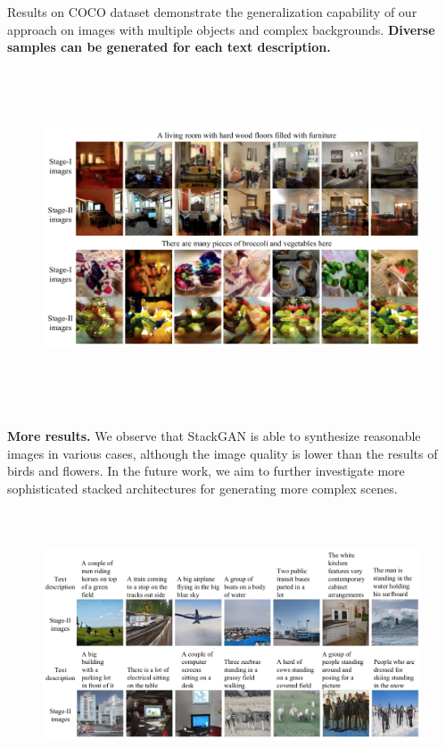 \documentclass[a4paper,12pt,oneside]{article}
\begin{document}
Results on COCO dataset demonstrate the generalization capability of our approach on images with multiple objects and complex backgrounds.
\textbf{Diverse samples can be generated for each text description.}
\begin{figure}[H]
  \centering
  \includegraphics[height=10cm,width=15cm]{Figure15.png}
  \end{figure}
  \paragraph{}
  \textbf{More results.} We observe that StackGAN is able to synthesize reasonable images in various cases, although the image quality is lower than the results of birds and flowers. In the future work, we aim to further investigate more sophisticated stacked architectures for generating more complex scenes.
  \begin{figure}[H]
    \centering
    \includegraphics[height=8cm,width=15cm]{Figure16.png}
    \end{figure}
\end{document}
